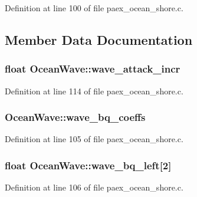 Definition at line 100 of file paex\+\_\+ocean\+\_\+shore.\+c.



\subsection{Member Data Documentation}
\subsubsection[{\texorpdfstring{wave\+\_\+attack\+\_\+incr}{wave_attack_incr}}]{\setlength{\rightskip}{0pt plus 5cm}float Ocean\+Wave\+::wave\+\_\+attack\+\_\+incr}\hypertarget{struct_ocean_wave_a0fc8fc2189599f8f5bf214d1a0a09e44}{}\label{struct_ocean_wave_a0fc8fc2189599f8f5bf214d1a0a09e44}


Definition at line 114 of file paex\+\_\+ocean\+\_\+shore.\+c.

\subsubsection[{\texorpdfstring{wave\+\_\+bq\+\_\+coeffs}{wave_bq_coeffs}}]{ Ocean\+Wave\+::wave\+\_\+bq\+\_\+coeffs}\hypertarget{struct_ocean_wave_a71beacaa3874895b2a12b859c75ef221}{}\label{struct_ocean_wave_a71beacaa3874895b2a12b859c75ef221}


Definition at line 105 of file paex\+\_\+ocean\+\_\+shore.\+c.

\subsubsection[{\texorpdfstring{wave\+\_\+bq\+\_\+left}{wave_bq_left}}]{\setlength{\rightskip}{0pt plus 5cm}float Ocean\+Wave\+::wave\+\_\+bq\+\_\+left\mbox{[}2\mbox{]}}\hypertarget{struct_ocean_wave_a3c8eb3bb9054a58dc559e3e14388d3b6}{}\label{struct_ocean_wave_a3c8eb3bb9054a58dc559e3e14388d3b6}


Definition at line 106 of file paex\+\_\+ocean\+\_\+shore.\+c.

